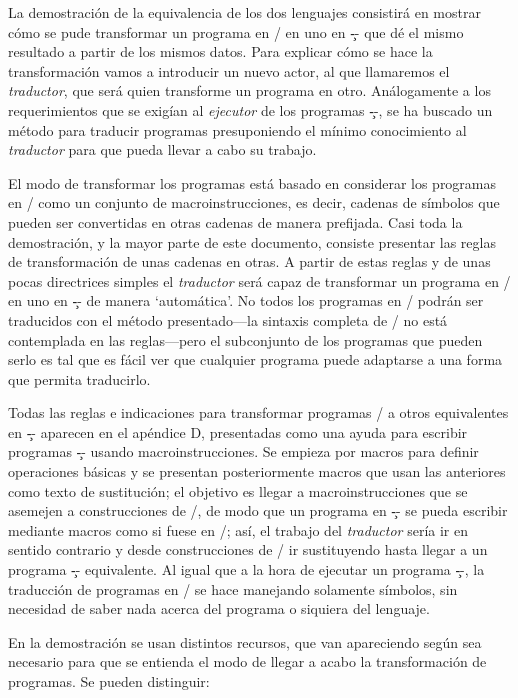 La demostración de la equivalencia de los dos lenguajes consistirá en mostrar cómo se pude
transformar un programa en \C/ en uno en \c-- que dé el mismo resultado a partir de los mismos
datos. Para explicar cómo se hace la transformación vamos a introducir un nuevo actor, al que
llamaremos el {\it traductor}, que será quien transforme un programa en otro. Análogamente a los
requerimientos que se exigían al {\it ejecutor} de los programas \c--, se ha buscado un método para
traducir programas presuponiendo el mínimo conocimiento al {\it traductor} para que pueda llevar a
cabo su trabajo.

El modo de transformar los programas está basado en considerar los programas en \C/ como un conjunto
de macroinstrucciones, es decir, cadenas de símbolos que pueden ser convertidas en otras cadenas de
manera prefijada. Casi toda la demostración, y la mayor parte de este documento, consiste presentar
las reglas de transformación de unas cadenas en otras. A partir de estas reglas y de unas pocas
directrices simples el {\it traductor} será capaz de transformar un programa en \C/ en uno en \c--
de manera ‘automática’. No todos los programas en \C/ podrán ser traducidos con el método
presentado---la sintaxis completa de \C/ no está contemplada en las reglas---pero el subconjunto de los
programas que pueden serlo es tal que es fácil ver que cualquier programa puede adaptarse a una
forma que permita traducirlo.

Todas las reglas e indicaciones para transformar programas \C/ a otros equivalentes en \c-- aparecen
en el apéndice D, presentadas como una ayuda para escribir programas \c-- usando
macroinstrucciones. Se empieza por macros para definir operaciones básicas y se presentan
posteriormente macros que usan las anteriores como texto de sustitución; el objetivo es llegar a
macroinstrucciones que se asemejen a construcciones de \C/, de modo que un programa en \c-- se pueda
escribir mediante macros como si fuese en \C/; así, el trabajo del {\it traductor} sería ir en
sentido contrario y desde construcciones de \C/ ir sustituyendo hasta llegar a un programa \c--
equivalente. Al igual que a la hora de ejecutar un programa \c--, la traducción de programas en \C/
se hace manejando solamente símbolos, sin necesidad de saber nada acerca del programa o siquiera del
lenguaje.

En la demostración se usan distintos recursos, que van apareciendo según sea necesario para que se
entienda el modo de llegar a acabo la transformación de programas. Se pueden distinguir:

